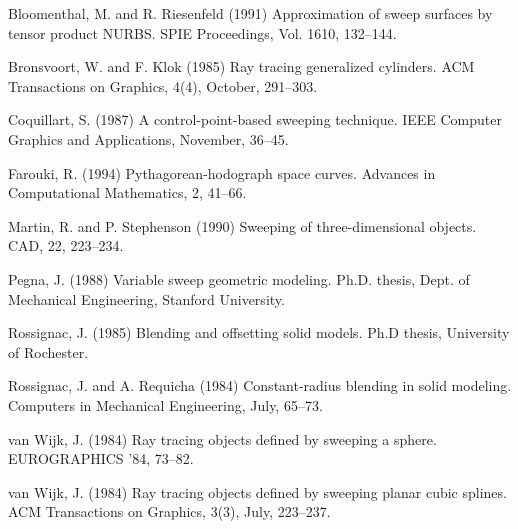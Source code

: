 
\begin{thebibliography}{Shoemake 85}

Bloomenthal, M. and R. Riesenfeld (1991)
Approximation of sweep surfaces by tensor product NURBS.
SPIE Proceedings,
Vol. 1610, 132--144.

Bronsvoort, W. and F. Klok (1985)
Ray tracing generalized cylinders.
ACM Transactions on Graphics, 4(4), October, 291--303.

Coquillart, S. (1987)
A control-point-based sweeping technique.
IEEE Computer Graphics and Applications, November, 36--45.

Farouki, R. (1994)
Pythagorean-hodograph space curves.
Advances in Computational Mathematics, 2, 41--66.

Martin, R. and P. Stephenson (1990)
Sweeping of three-dimensional objects.
CAD, 22, 223--234.


Pegna, J. (1988) Variable sweep geometric modeling.
Ph.D. thesis, Dept. of Mechanical Engineering, Stanford University.

Rossignac, J. (1985)
Blending and offsetting solid models.
Ph.D thesis, University of Rochester.

Rossignac, J. and A. Requicha (1984)
Constant-radius blending in solid modeling.
Computers in Mechanical Engineering, July, 65--73.


van Wijk, J. (1984)
Ray tracing objects defined by sweeping a sphere.
EUROGRAPHICS '84, 73--82.

van Wijk, J. (1984)
Ray tracing objects defined by sweeping planar cubic splines.
ACM Transactions on Graphics, 3(3), July, 223--237.

\end{thebibliography}


